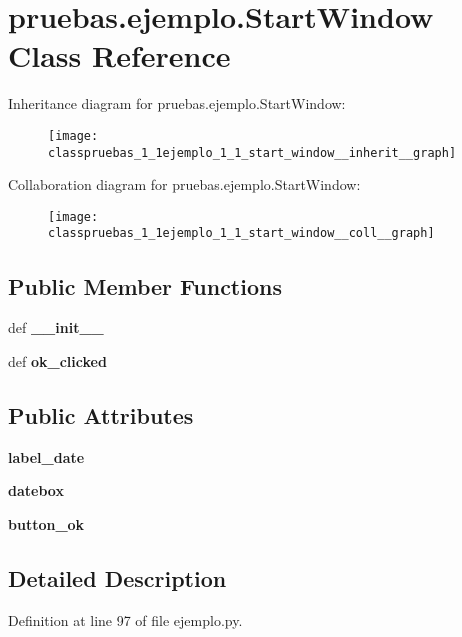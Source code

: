 \section{pruebas.\-ejemplo.\-Start\-Window \-Class \-Reference}
\label{classpruebas_1_1ejemplo_1_1_start_window}


\-Inheritance diagram for pruebas.\-ejemplo.\-Start\-Window\-:\nopagebreak
\begin{figure}[H]
\begin{center}
\leavevmode
\texttt{[image: classpruebas\_1\_1ejemplo\_1\_1\_start\_window\_\_inherit\_\_graph]}
\end{center}
\end{figure}


\-Collaboration diagram for pruebas.\-ejemplo.\-Start\-Window\-:\nopagebreak
\begin{figure}[H]
\begin{center}
\leavevmode
\texttt{[image: classpruebas\_1\_1ejemplo\_1\_1\_start\_window\_\_coll\_\_graph]}
\end{center}
\end{figure}
\subsection*{\-Public \-Member \-Functions}
\begin{DoxyCompactItemize}
\item 
def {\bf \-\_\-\-\_\-init\-\_\-\-\_\-}
\item 
def {\bf ok\-\_\-clicked}
\end{DoxyCompactItemize}
\subsection*{\-Public \-Attributes}
\begin{DoxyCompactItemize}
\item 
{\bf label\-\_\-date}
\item 
{\bf datebox}
\item 
{\bf button\-\_\-ok}
\end{DoxyCompactItemize}


\subsection{\-Detailed \-Description}


\-Definition at line 97 of file ejemplo.\-py.



